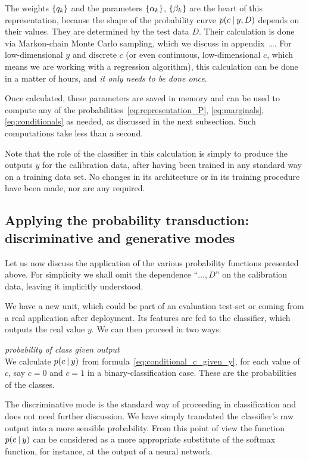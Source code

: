 \documentclass[\ifafour a4paper,12pt,\else a5paper,10pt,\fi%
onecolumn,oneside,article,%
british%
]{memoir}
\theoremstyle{remark}
\theoremstyle{innote}
\newcommand*{\pencil}{{\fontencoding{U}\fontfamily{fontawesometwo}\selectfont\symbol{210}}}
\newcommand{\mynotep}[1]{{\footnotesize\color{notecolour}\pencil\ #1}}
\DeclarePairedDelimiter\set{\{}{\}} %
\renewcommand*{\|}[1][]{\nonscript\:#1\vert\nonscript\:\mathopen{}}
\begin{document}
\medskip

The weights $\set{q_{k}}$ and the parameters $\set{\alpha_{k}}$, $\set{\beta_{k}}$ are the heart of this representation, because the shape of the probability curve $p(c \| y, D)$ depends on their values. They are determined by the test data $D$. Their calculation is done via Markon-chain Monte Carlo sampling, which we discuss in appendix\mynotep{\ldots}. For low-dimensional $y$ and discrete $c$ (or even continuous, low-dimensional $c$, which means we are working with a regression algorithm), this calculation can be done in a matter of hours, and \emph{it only needs to be done once}.

Once calculated, these parameters are saved in memory and can be used to compute any of the probabilities~\eqref{eq:representation_P}, \eqref{eq:marginals}, \eqref{eq:conditionals} as needed, as discussed in the next subsection. Such computations take less than a second.

Note that the role of the classifier in this calculation is simply to produce the outputs $y$ for the calibration data, after having been trained in any standard way on a training data set. No changes in its architecture or in its training procedure have been made, nor are any required.


\subsection{Applying the probability transduction: discriminative and generative modes}
\label{sec:effect_transd}

Let us now discuss the application of the various probability functions presented above. For simplicity we shall omit the dependence \enquote{$\dotsc, D$} on the calibration data, leaving it implicitly understood.

We have a new unit, which could be part of an evaluation test-set or coming from a real application after deployment. Its features are fed to the classifier, which outputs the real value $y$. We can then proceed in two ways:
\begin{description}[font=\textit]
\item[Discriminative mode:] \textit{probability of class given output}\\
 We calculate $p(c \| y)$ from formula~\eqref{eq:conditional_c_given_y}, for each value of $c$, say $c=0$ and $c=1$ in a binary-classification case. These are the probabilities of the classes.
\end{description}
The discriminative mode is the standard way of proceeding in classification and does not need further discussion. We have simply translated the classifier's raw output into a more sensible probability. From this point of view the function $p(c \| y)$ can be considered as a more appropriate substitute of the softmax function, for instance, at the output of a neural network.
\end{document}
